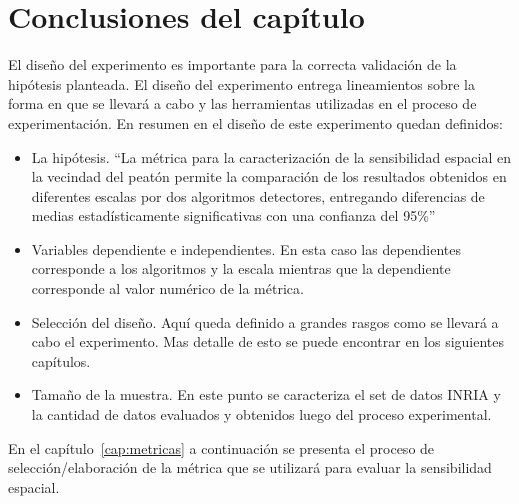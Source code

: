 
\section{Conclusiones del capítulo}

El diseño del experimento es importante para la correcta validación de la hipótesis planteada. El diseño del experimento entrega lineamientos sobre la forma en que se llevará a cabo  y las herramientas utilizadas en el proceso de experimentación. En resumen en el diseño de este experimento quedan definidos:

\begin{itemize}

\item La hipótesis. ``La métrica para la caracterización de la sensibilidad espacial en la vecindad del peatón permite la comparación de los resultados obtenidos en diferentes escalas por dos algoritmos detectores, entregando diferencias de medias estadísticamente significativas con una confianza del 95\%''

\item Variables dependiente e independientes. En esta caso las dependientes corresponde a los algoritmos y la escala mientras que la dependiente corresponde al valor numérico de la métrica.

\item Selección del diseño. Aquí queda definido a grandes rasgos como se llevará a cabo el experimento. Mas detalle de esto se puede encontrar en los siguientes capítulos.

\item Tamaño de la muestra. En este punto se caracteriza el set de datos INRIA y la cantidad de datos evaluados y obtenidos luego del proceso experimental.

\end{itemize}

En el capítulo~\ref{cap:metricas} a continuación se presenta el proceso de selección/elaboración de la métrica que se utilizará para evaluar la sensibilidad espacial.


